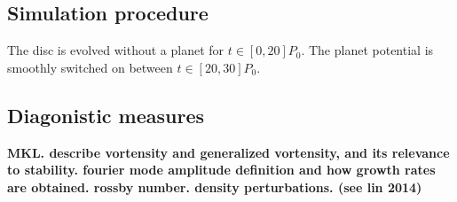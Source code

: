 
\subsection{Simulation procedure}
The disc is evolved without a planet for $t\in[0,20]P_0$. The planet potential is smoothly switched on
between $t\in[20,30]P_0$.



\subsection{Diagonistic measures}
{\bf {MKL.} describe vortensity and generalized vortensity, and its
  relevance to stability. fourier mode amplitude definition and how
  growth rates are obtained. rossby number. density
  perturbations. (see lin 2014)
}
